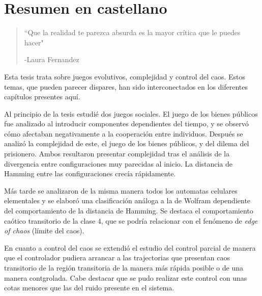 \chapter{Resumen en castellano}



\begin{quotation}
	\vspace{-3cm}
    \begin{flushright}
    \begin{minipage}[t][5cm][b]{0.5\textwidth}
    { ``Que la realidad te parezca absurda es la mayor crítica que le puedes hacer"}
    
    \bigskip
    
    -{\small  Laura Fernandez}
    \end{minipage}
    \end{flushright}
    
    \vspace{0.5cm}
\end{quotation}






Esta tesis trata sobre juegos evolutivos, complejidad y control del caos. Estos temas, que pueden parecer dispares, han sido interconectados en los diferentes capítulos presentes aquí. 

Al principio de la tesis estudié dos juegos sociales. El juego de los bienes públicos fue analizado al introducir componentes dependientes del tiempo, y se observó cómo afectaban negativamente a la cooperación entre individuos. Después se analizó la complejidad de este, el juego de los bienes públicos, y del dilema del prisionero. Ambos resultaron presentar complejidad tras el análisis de la divergencia entre configuraciones muy parecidas al inicio. La distancia de Hamming entre las configuraciones crecía rápidamente.

Más tarde se analizaron de la misma manera todos los automatas celulares elementales y se elaboró una clasificación análoga a la de Wolfram dependiente del comportamiento de la distancia de Hamming. Se destaca el comportamiento caótico transitorio de la clase $4$, que se podría relacionar con el fenómeno de \textit{edge of chaos} (límite del caos).

En cuanto a control del caos se extendió el estudio del control parcial de manera que el controlador pudiera arrancar a las trajectorias que presentan caos transitorio de la región transitoria de la manera más rápida posible o de una manera contgrolada. Cabe destacar que se pudo realizar este control con unas cotas menores que las del ruido presente en el sistema.

